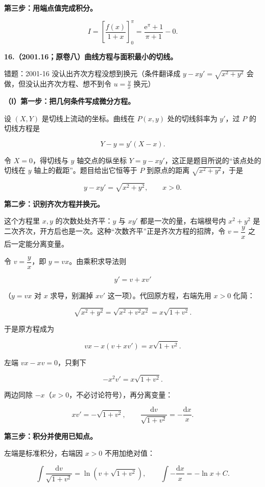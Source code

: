 \documentclass[UTF8,11pt,fontset=windows]{ctexart}
\begin{document}
\textbf{第三步：用端点值完成积分。}

$$
I=\left[\frac{f(x)}{1+x}\right]_0^\pi
=\frac{\mathrm e^\pi+1}{\pi+1}-0.
$$

\clearpage

\textbf{16.（2001.16；原卷八）曲线方程与面积最小的切线。}

\begingroup\color{gray}错题：2001-16 没认出齐次方程没想到换元（条件翻译成 $y-xy'=\sqrt{x^{2}+y^{2}}$ 会做，但没认出齐次方程、想不到令 $u=\frac{y}{x}$ 换元）\par\endgroup

\textbf{（Ⅰ）第一步：把几何条件写成微分方程。}

设 $(X,Y)$ 是切线上流动的坐标。曲线在 $P(x,y)$ 处的切线斜率为 $y'$，过 $P$ 的切线方程是

$$
Y-y=y'(X-x).
$$

令 $X=0$，得切线与 $y$ 轴交点的纵坐标 $Y=y-xy'$，这正是题目所说的“该点处的切线在 $y$ 轴上的截距”。题目给出它恒等于 $P$ 到原点的距离 $\sqrt{x^2+y^2}$，于是

$$
y-xy'=\sqrt{x^2+y^2},\qquad x>0.
$$

\textbf{第二步：识别齐次方程并换元。}

这个方程里 $x,y$ 的次数处处齐平：$y$ 与 $xy'$ 都是一次的量，右端根号内 $x^2+y^2$ 是二次齐次，开方后也是一次。这种“次数齐平”正是齐次方程的招牌，令 $v=\dfrac yx$ 之后一定能分离变量。

令 $v=\dfrac yx$，即 $y=vx$。由乘积求导法则

$$
y'=v+xv'
$$

（$y=vx$ 对 $x$ 求导，别漏掉 $xv'$ 这一项）。代回原方程，右端先用 $x>0$ 化简：

$$
\sqrt{x^2+y^2}=\sqrt{x^2+v^2x^2}=x\sqrt{1+v^2}.
$$

于是原方程成为

$$
vx-x\left(v+xv'\right)=x\sqrt{1+v^2}.
$$

左端 $vx-xv=0$，只剩下

$$
-x^2v'=x\sqrt{1+v^2}.
$$

两边同除 $-x$（$x>0$，不必讨论符号），再分离变量：

$$
xv'=-\sqrt{1+v^2},
\qquad \frac{\mathrm dv}{\sqrt{1+v^2}}=-\frac{\mathrm dx}{x}.
$$

\textbf{第三步：积分并使用已知点。}

左端是标准积分，右端因 $x>0$ 不用加绝对值：

$$
\int\frac{\mathrm dv}{\sqrt{1+v^2}}=\ln\left(v+\sqrt{1+v^2}\right),
\qquad \int-\frac{\mathrm dx}{x}=-\ln x+C.
$$
\end{document}
